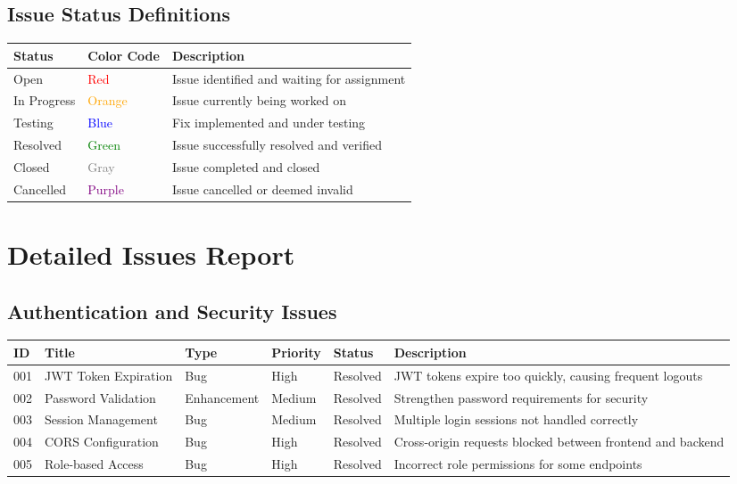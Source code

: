 \documentclass[12pt,a4paper]{article}
\begin{document}
\subsection{Issue Status Definitions}

\begin{longtable}{|p{1.8cm}|p{2.5cm}|p{8.2cm}|}
\hline
\textbf{Status} & \textbf{Color Code} & \textbf{Description} \\
\hline
Open & \textcolor{red}{Red} & Issue identified and waiting for assignment \\
\hline
In Progress & \textcolor{orange}{Orange} & Issue currently being worked on \\
\hline
Testing & \textcolor{blue}{Blue} & Fix implemented and under testing \\
\hline
Resolved & \textcolor{green}{Green} & Issue successfully resolved and verified \\
\hline
Closed & \textcolor{gray}{Gray} & Issue completed and closed \\
\hline
Cancelled & \textcolor{purple}{Purple} & Issue cancelled or deemed invalid \\
\hline
\end{longtable}

\section{Detailed Issues Report}

\subsection{Authentication and Security Issues}

\begin{longtable}{|p{0.8cm}|p{2.5cm}|p{1.5cm}|p{1.5cm}|p{1.5cm}|p{4.2cm}|}
\hline
\textbf{ID} & \textbf{Title} & \textbf{Type} & \textbf{Priority} & \textbf{Status} & \textbf{Description} \\
\hline
001 & JWT Token Expiration & Bug & High & Resolved & JWT tokens expire too quickly, causing frequent logouts \\
\hline
002 & Password Validation & Enhancement & Medium & Resolved & Strengthen password requirements for security \\
\hline
003 & Session Management & Bug & Medium & Resolved & Multiple login sessions not handled correctly \\
\hline
004 & CORS Configuration & Bug & High & Resolved & Cross-origin requests blocked between frontend and backend \\
\hline
005 & Role-based Access & Bug & High & Resolved & Incorrect role permissions for some endpoints \\
\hline
\end{longtable}
\end{document}
